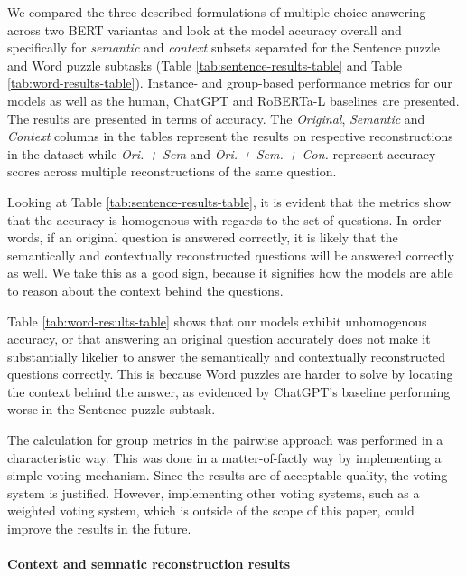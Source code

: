 We compared the three described formulations of multiple choice answering across two BERT variantas and look at the model accuracy overall and specifically for \emph{semantic} and \emph{context} subsets separated for the Sentence puzzle and Word puzzle subtasks (Table \ref{tab:sentence-results-table} and Table \ref{tab:word-results-table}). 
Instance- and group-based performance metrics for our models as well as the human, ChatGPT and RoBERTa-L baselines are presented.
The results are presented in terms of accuracy.
The \emph{Original}, \emph{Semantic} and \emph{Context} columns in the tables represent the results on respective reconstructions in the dataset while \emph{Ori. + Sem} and \emph{Ori. + Sem. + Con.} represent accuracy scores across multiple reconstructions of the same question.

Looking at Table \ref{tab:sentence-results-table}, it is evident that the metrics show that the accuracy is homogenous with regards to the set of questions.
In order words, if an original question is answered correctly, it is likely that the semantically and contextually reconstructed questions will be answered correctly as well.
We take this as a good sign, because it signifies how the models are able to reason about the context behind the questions.

Table \ref{tab:word-results-table} shows that our models exhibit unhomogenous accuracy, or that answering an original question accurately does not make it substantially likelier to answer the semantically and contextually reconstructed questions correctly.
This is because Word puzzles are harder to solve by locating the context behind the answer, as evidenced by ChatGPT's baseline performing worse in the Sentence puzzle subtask.

The calculation for group metrics in the pairwise approach was performed in a characteristic way.
This was done in a matter-of-factly way by implementing a simple voting mechanism.
Since the results are of acceptable quality, the voting system is justified.
However, implementing other voting systems, such as a weighted voting system, which is outside of the scope of this paper, could improve the results in the future.

\paragraph{Context and semnatic reconstruction results} \


